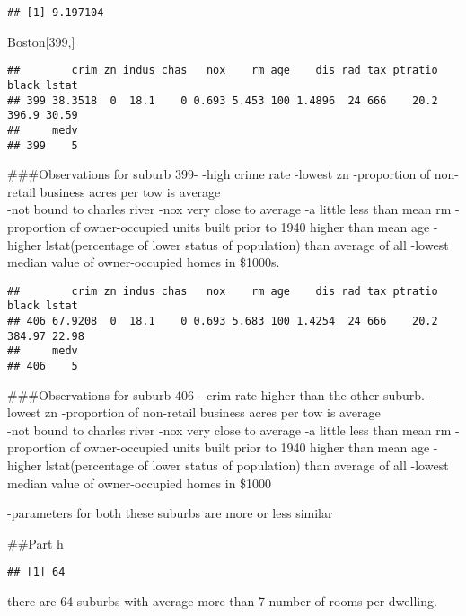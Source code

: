 \documentclass[
]{article}
\newenvironment{Shaded}{\begin{snugshade}}{\end{snugshade}}
\newcommand{\DecValTok}[1]{\textcolor[rgb]{0.00,0.00,0.81}{#1}}
\newcommand{\NormalTok}[1]{#1}
\begin{document}
\begin{verbatim}
## [1] 9.197104
\end{verbatim}

\begin{Shaded}
\begin{Highlighting}[]
\NormalTok{Boston[}\DecValTok{399}\NormalTok{,]}
\end{Highlighting}
\end{Shaded}

\begin{verbatim}
##        crim zn indus chas   nox    rm age    dis rad tax ptratio black lstat
## 399 38.3518  0  18.1    0 0.693 5.453 100 1.4896  24 666    20.2 396.9 30.59
##     medv
## 399    5
\end{verbatim}

\#\#\#Observations for suburb 399- -high crime rate -lowest zn
-proportion of non-retail business acres per tow is average\\
-not bound to charles river -nox very close to average -a little less
than mean rm -proportion of owner-occupied units built prior to 1940
higher than mean age -higher lstat(percentage of lower status of
population) than average of all -lowest median value of owner-occupied
homes in \$1000s.

\begin{verbatim}
##        crim zn indus chas   nox    rm age    dis rad tax ptratio  black lstat
## 406 67.9208  0  18.1    0 0.693 5.683 100 1.4254  24 666    20.2 384.97 22.98
##     medv
## 406    5
\end{verbatim}

\#\#\#Observations for suburb 406- -crim rate higher than the other
suburb. -lowest zn -proportion of non-retail business acres per tow is
average\\
-not bound to charles river -nox very close to average -a little less
than mean rm -proportion of owner-occupied units built prior to 1940
higher than mean age -higher lstat(percentage of lower status of
population) than average of all -lowest median value of owner-occupied
homes in \$1000

-parameters for both these suburbs are more or less similar

\#\#Part h

\begin{verbatim}
## [1] 64
\end{verbatim}

there are 64 suburbs with average more than 7 number of rooms per
dwelling.
\end{document}
